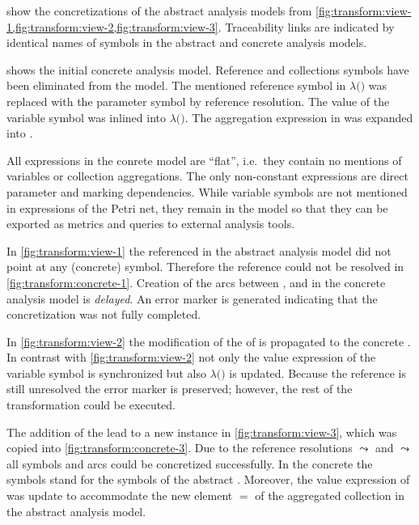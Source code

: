 \begin{runningExample}
   show the concretizations of the abstract analysis models from \vref{fig:transform:view-1,fig:transform:view-2,fig:transform:view-3}. Traceability links are indicated by identical names of symbols in the abstract and concrete analysis models.

   shows the initial concrete analysis model. Reference and collections symbols have been eliminated from the model. The mentioned reference symbol  in  \(\lambda(\)\()\) was replaced with the parameter symbol  by reference resolution. The value of the variable symbol  was inlined into \(\lambda(\)\()\). The aggregation expression in  was expanded into .

  All expressions in the conrete model are \enquote{flat}, i.e.~they contain no mentions of variables or collection aggregations. The only non-constant expressions are direct parameter and marking dependencies. While variable symbols are not mentioned in expressions of the Petri net, they remain in the model so that they can be exported as metrics and queries to external analysis tools.

  In \vref{fig:transform:view-1} the referenced  in the abstract analysis model did not point at any (concrete) symbol. Therefore the reference could not be resolved in \vref{fig:transform:concrete-1}. Creation of the arcs between ,  and  in the concrete analysis model is \emph{delayed}. An error marker is generated indicating that the concretization was not fully completed.

  In \vref{fig:transform:view-2} the modification of the  of  is propagated to the concrete . In contrast with \vref{fig:transform:view-2} not only the value expression of the variable symbol  is synchronized but also \(\lambda(\)\()\) is updated. Because the reference  is still unresolved the error marker is preserved; however, the rest of the transformation could be executed.

  The addition of the   lead to a new  instance  in \vref{fig:transform:view-3}, which was copied into \vref{fig:transform:concrete-3}. Due to the reference resolutions  \(\leadsto\)  and  \(\leadsto\)  all symbols and arcs could be concretized successfully. In the concrete  the  symbols stand for the  symbols of the abstract . Moreover, the value expression of  was update to accommodate the new element  \(=\)  of the aggregated collection  in the abstract analysis model.
\end{runningExample}

